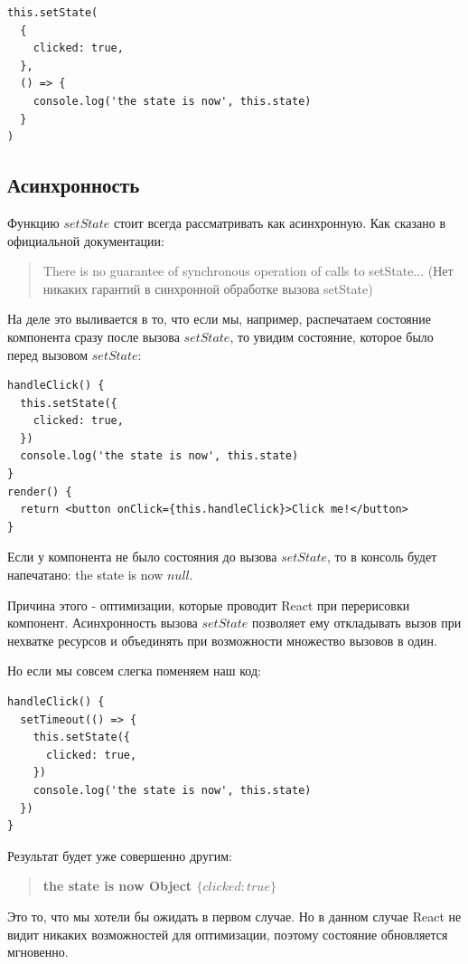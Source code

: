 \begin{lstlisting}
this.setState(
  {
    clicked: true,
  }, 
  () => {
    console.log('the state is now', this.state)
  }
)
\end{lstlisting}

\subsection*{Асинхронность}

Функцию $setState$ стоит всегда рассматривать как асинхронную. 
Как сказано в официальной документации:

\begin{quotation}
There is no guarantee of synchronous operation of calls to setState... (Нет никаких гарантий в синхронной обработке вызова setState)
\end{quotation}

На деле это выливается в то, что если мы, например, распечатаем состояние компонента сразу после вызова $setState$, то увидим состояние, которое было перед вызовом $setState$:

\begin{lstlisting}
handleClick() {
  this.setState({
    clicked: true,
  })
  console.log('the state is now', this.state)
}
render() {
  return <button onClick={this.handleClick}>Click me!</button>
}
\end{lstlisting}

Если у компонента не было состояния до вызова $setState$, то в консоль будет напечатано: the state is now $null$.

Причина этого - оптимизации, которые проводит React при перерисовки компонент. Асинхронность вызова $setState$ позволяет ему откладывать вызов при нехватке ресурсов и объединять при возможности множество вызовов в один.

Но если мы совсем слегка поменяем наш код:

\begin{lstlisting}
handleClick() {
  setTimeout(() => {
    this.setState({
      clicked: true,
    })
    console.log('the state is now', this.state)
  })
}
\end{lstlisting}

Результат будет уже совершенно другим:

\begin{quotation}
	\textbf{the state is now Object $\{clicked: true\}$}
\end{quotation}

Это то, что мы хотели бы ожидать в первом случае. 
Но в данном случае React не видит никаких возможностей для оптимизации, поэтому состояние обновляется мгновенно.

